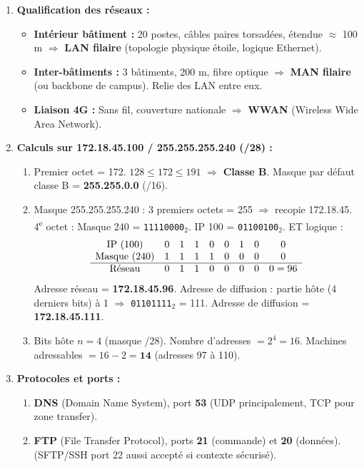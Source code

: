 \documentclass[11pt]{article}
\begin{document}
\begin{corrige}
\begin{enumerate}
\item \textbf{Qualification des réseaux :}
\begin{itemize}
\item \textbf{Intérieur bâtiment :} 20 postes, câbles paires torsadées, étendue $\approx$ 100 m $\Rightarrow$ \textbf{LAN filaire} (topologie physique étoile, logique Ethernet).
\item \textbf{Inter-bâtiments :} 3 bâtiments, 200 m, fibre optique $\Rightarrow$ \textbf{MAN filaire} (ou backbone de campus). Relie des LAN entre eux.
\item \textbf{Liaison 4G :} Sans fil, couverture nationale $\Rightarrow$ \textbf{WWAN} (Wireless Wide Area Network).
\end{itemize}
\item \textbf{Calculs sur 172.18.45.100 / 255.255.255.240 (/28) :}
\begin{enumerate}
\item Premier octet = 172. $128 \le 172 \le 191$ $\Rightarrow$ \textbf{Classe B}. Masque par défaut classe B = \textbf{255.255.0.0} (/16).
\item Masque 255.255.255.240 : 3 premiers octets = 255 $\Rightarrow$ recopie 172.18.45.
4\textsuperscript{e} octet : Masque 240 = \texttt{11110000}$_2$. IP 100 = \texttt{01100100}$_2$.
ET logique :
\[
\begin{array}{c@{\quad}cccccccc}
\text{IP (100)} & 0 & 1 & 1 & 0 & 0 & 1 & 0 & 0 \\
\text{Masque (240)} & 1 & 1 & 1 & 1 & 0 & 0 & 0 & 0 \\ \hline
\text{Réseau} & 0 & 1 & 1 & 0 & 0 & 0 & 0 & 0 = 96
\end{array}
\]
Adresse réseau = \textbf{172.18.45.96}.
Adresse de diffusion : partie hôte (4 derniers bits) à 1 $\Rightarrow$ \texttt{01101111}$_2$ = 111.
Adresse de diffusion = \textbf{172.18.45.111}.
\item Bits hôte $n=4$ (masque /28). Nombre d'adresses $= 2^4 = 16$. Machines adressables $= 16 - 2 = \textbf{14}$ (adresses 97 à 110).
\end{enumerate}
\item \textbf{Protocoles et ports :}
\begin{enumerate}
\item \textbf{DNS} (Domain Name System), port \textbf{53} (UDP principalement, TCP pour zone transfer).
\item \textbf{FTP} (File Transfer Protocol), ports \textbf{21} (commande) et \textbf{20} (données). (SFTP/SSH port 22 aussi accepté si contexte sécurisé).

\end{enumerate}
\end{enumerate}
\end{corrige}
\end{document}
